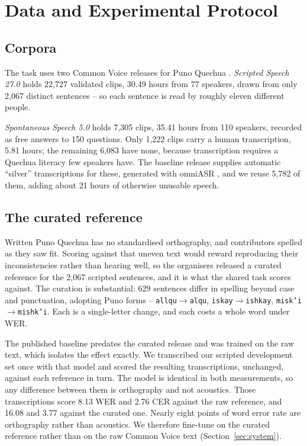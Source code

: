 \section{Data and Experimental Protocol}
\label{sec:data}

\subsection{Corpora}

The task uses two Common Voice \cite{ardila2020commonvoice} releases for Puno
Quechua \cite{huaman2026quechua}. \emph{Scripted Speech 27.0} holds 22{,}727 validated clips, 30.49 hours from 77
speakers, drawn from only 2{,}067 distinct sentences -- so each sentence is read
by roughly eleven different people.

\emph{Spontaneous Speech 5.0} holds 7{,}305 clips, 35.41 hours from 110
speakers, recorded as free answers to 150 questions. Only 1{,}222 clips carry a human transcription, 5.81 hours; the remaining
6{,}083 have none, because transcription requires a Quechua literacy few
speakers have. The baseline
release supplies automatic ``silver'' transcriptions for these, generated with
omniASR \cite{keren2025omnilingual}, and we reuse 5{,}782 of them, adding about 21 hours of otherwise unusable speech.

\subsection{The curated reference}
\label{sec:curated}

Written Puno Quechua has no standardised orthography, and contributors spelled
as they saw fit. Scoring against that uneven text would reward reproducing
their inconsistencies rather than hearing well, so the organisers released a
curated reference for the 2{,}067 scripted sentences, and it is what the shared
task scores against. The curation is substantial: 629 sentences differ in spelling beyond case and punctuation,
adopting Puno forms --
\texttt{allqu}$\rightarrow$\texttt{alqu},
\texttt{iskay}$\rightarrow$\texttt{ishkay},
\texttt{misk'i}$\rightarrow$\texttt{mishk'i}. Each is a single-letter change,
and each costs a whole word under WER.

The published baseline predates the curated release and was trained on the raw
text, which isolates the effect exactly. We transcribed our scripted
development set once with that model and scored the resulting transcriptions,
unchanged, against each reference in turn. The model is identical in both
measurements, so any difference between them is orthography and not acoustics.
Those transcriptions score
8.13 WER and 2.76 CER against the raw reference, and 16.08 and 3.77 against the
curated one. Nearly eight points of word error rate are orthography rather than
acoustics. We therefore fine-tune on the curated reference rather than on the
raw Common Voice text (Section~\ref{sec:system}).

